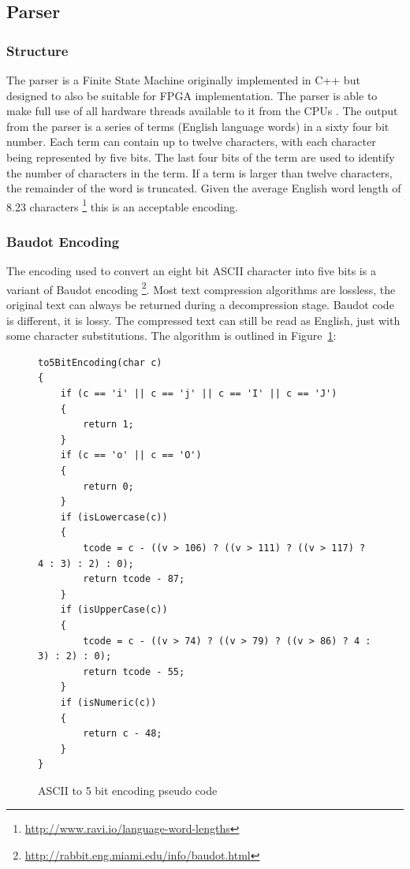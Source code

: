 \subsection{Parser}

\subsubsection{Structure}

The parser is a Finite State Machine originally implemented in C++ but designed
to also be suitable for FPGA implementation. The parser is able to make full use
of all hardware threads available to it from the CPUs \cite{HybridCPUFPGA}. The
output from the parser is a series of terms (English language words) in a sixty
four bit number. Each term can contain up to twelve characters, with each
character being represented by five bits. The last four bits of the term are
used to identify the number of characters in the term. If a term is larger than
twelve characters, the remainder of the word is truncated. Given the average
English word length of 8.23 characters
\footnote{\url{http://www.ravi.io/language-word-lengths}} this is an acceptable
encoding.

\subsubsection{Baudot Encoding}

The encoding used to convert an eight bit ASCII character into five bits is a
variant of Baudot encoding
\footnote{\url{http://rabbit.eng.miami.edu/info/baudot.html}}. Most text
compression algorithms are lossless, the original text can always be returned
during a decompression stage. Baudot code is different, it is lossy. The
compressed text can still be read as English, just with some character
substitutions. The algorithm is outlined in Figure~\ref{baudotCode}:

\begin{figure}[H]
\small\begin{verbatim}
to5BitEncoding(char c)
{
    if (c == 'i' || c == 'j' || c == 'I' || c == 'J')
    {
        return 1;
    }
    if (c == 'o' || c == 'O')
    {
        return 0;
    }
    if (isLowercase(c))
    {
        tcode = c - ((v > 106) ? ((v > 111) ? ((v > 117) ? 4 : 3) : 2) : 0);
        return tcode - 87;
    }
    if (isUpperCase(c))
    {
        tcode = c - ((v > 74) ? ((v > 79) ? ((v > 86) ? 4 : 3) : 2) : 0);
        return tcode - 55;
    }
    if (isNumeric(c))
    {
        return c - 48;
    }
}
\end{verbatim}
\caption{ASCII to 5 bit encoding pseudo code}
\label{baudotCode}
\end{figure}


